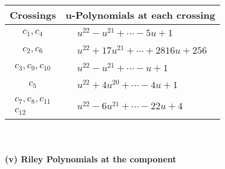 \documentclass[1p]{elsarticle_modified}
\theoremstyle{definition}
\begin{document}
\begin{tabular}{m{50pt}|m{274pt}}
Crossings & \hspace{64pt}u-Polynomials at each crossing \\
\hline $$\begin{aligned}c_{1},c_{4}\end{aligned}$$&$\begin{aligned}
&u^{22}- u^{21}+\cdots-5 u+1
\end{aligned}$\\
\hline $$\begin{aligned}c_{2},c_{6}\end{aligned}$$&$\begin{aligned}
&u^{22}+17 u^{21}+\cdots+2816 u+256
\end{aligned}$\\
\hline $$\begin{aligned}c_{3},c_{9},c_{10}\end{aligned}$$&$\begin{aligned}
&u^{22}- u^{21}+\cdots- u+1
\end{aligned}$\\
\hline $$\begin{aligned}c_{5}\end{aligned}$$&$\begin{aligned}
&u^{22}+4 u^{20}+\cdots-4 u+1
\end{aligned}$\\
\hline $$\begin{aligned}c_{7},c_{8},c_{11}\\c_{12}\end{aligned}$$&$\begin{aligned}
&u^{22}-6 u^{21}+\cdots-22 u+4
\end{aligned}$\\
\hline
\end{tabular}\\~\\
\newpage\renewcommand{\arraystretch}{1}
\flushleft \textbf{(v) Riley Polynomials at the component}\newline \\
\end{document}
